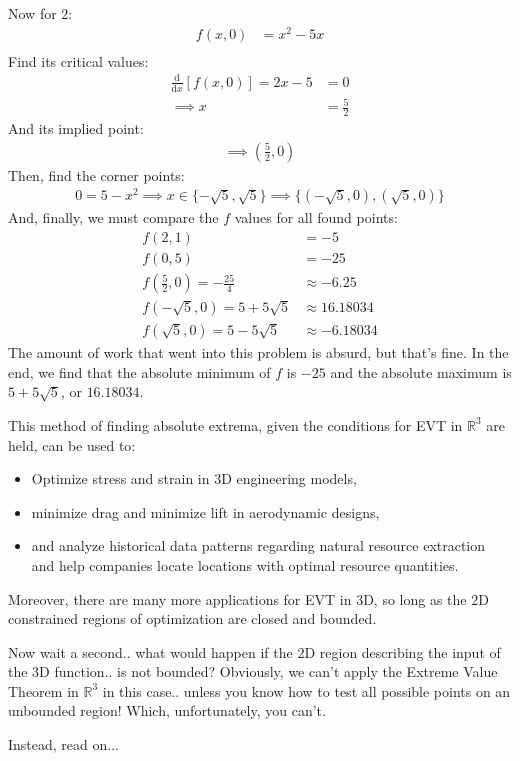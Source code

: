 Now for $2$:
\begin{align*}
	f(x, 0) &= x^2-5x\\
\end{align*}
Find its critical values:
\begin{align*}
	\frac{\mathrm{d}}{\mathrm{d}x}[f(x, 0)] = 2x-5&=0\\
	\implies x&=\frac{5}{2}
\end{align*}
And its implied point:
\begin{align*}
	\implies \left(\frac{5}{2}, 0\right)
\end{align*}
Then, find the corner points:
\begin{align*}
	0 = 5-x^2\implies x\in\{-\sqrt{5}, \sqrt{5}\}
	\implies \{(-\sqrt{5}, 0), (\sqrt{5}, 0)\}
\end{align*}
And, finally, we must compare the $f$ values for all found points:
\begin{align*}
	f(2, 1) &= -5\\
	f(0, 5) &= -25\\
	f\left(\frac{5}{2}, 0\right) = -\frac{25}{4} &\approx -6.25\\
	f(-\sqrt{5}, 0) = 5+5\sqrt{5} &\approx 16.18034\\
	f(\sqrt{5}, 0) = 5-5\sqrt{5} &\approx -6.18034
\end{align*}
The amount of work that went into this problem is absurd, but that's fine. In the end, we find that the absolute minimum of $f$ is $-25$ and the absolute maximum is $5+5\sqrt{5}$, or $16.18034$.

This method of finding absolute extrema, given the conditions for EVT in $\mathbb{R}^3$ are held, can be used to:
\begin{itemize}
	\item Optimize stress and strain in $3$D engineering models,
	\item minimize drag and minimize lift in aerodynamic designs,
	\item and analyze historical data patterns regarding natural resource extraction and help companies locate locations with optimal resource quantities. 
\end{itemize}
Moreover, there are many more applications for EVT in $3$D, so long as the $2$D constrained regions of optimization are closed and bounded.

Now wait a second.. what would happen if the $2$D region describing the input of the $3$D function.. is not bounded?
Obviously, we can't apply the Extreme Value Theorem in $\mathbb{R}^3$ in this case.. unless you know how to test all possible points on an unbounded region!
Which, unfortunately, you can't.

Instead, read on...